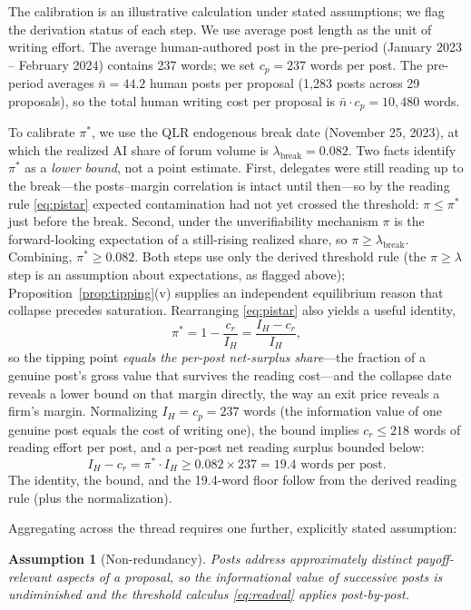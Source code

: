 \documentclass[12pt]{article}
\newtheorem{assumption}{Assumption}
\begin{document}
The calibration is an illustrative calculation under stated assumptions; we flag the derivation status of each step. We use average post length as the unit of writing effort. The average human-authored post in the pre-period (January 2023 -- February 2024) contains 237 words; we set $c_p = 237$ words per post. The pre-period averages $\bar{n} = 44.2$ human posts per proposal (1{,}283 posts across 29 proposals), so the total human writing cost per proposal is $\bar{n} \cdot c_p = 10{,}480$ words.

To calibrate $\pi^*$, we use the QLR endogenous break date (November 25, 2023), at which the realized AI share of forum volume is $\lambda_{\text{break}} = 0.082$. Two facts identify $\pi^*$ as a \emph{lower bound}, not a point estimate. First, delegates were still reading up to the break---the posts--margin correlation is intact until then---so by the reading rule \eqref{eq:pistar} expected contamination had not yet crossed the threshold: $\pi \le \pi^*$ just before the break. Second, under the unverifiability mechanism $\pi$ is the forward-looking expectation of a still-rising realized share, so $\pi \ge \lambda_{\text{break}}$. Combining, $\pi^* \ge 0.082$. Both steps use only the derived threshold rule (the $\pi \ge \lambda$ step is an assumption about expectations, as flagged above); Proposition~\ref{prop:tipping}(v) supplies an independent equilibrium reason that collapse precedes saturation. Rearranging \eqref{eq:pistar} also yields a useful identity,
\[
  \pi^* = 1 - \frac{c_r}{I_H} = \frac{I_H - c_r}{I_H},
\]
so the tipping point \emph{equals the per-post net-surplus share}---the fraction of a genuine post's gross value that survives the reading cost---and the collapse date reveals a lower bound on that margin directly, the way an exit price reveals a firm's margin. Normalizing $I_H = c_p = 237$ words (the information value of one genuine post equals the cost of writing one), the bound implies $c_r \le 218$ words of reading effort per post, and a per-post net reading surplus bounded below:
\[
  I_H - c_r = \pi^* \cdot I_H \ge 0.082 \times 237 = 19.4 \text{ words per post}.
\]
The identity, the bound, and the 19.4-word floor follow from the derived reading rule (plus the normalization).

Aggregating across the thread requires one further, explicitly stated assumption:

\begin{assumption}[Non-redundancy]
\label{ass:nr}
Posts address approximately distinct payoff-relevant aspects of a proposal, so the informational value of successive posts is undiminished and the threshold calculus \eqref{eq:readval} applies post-by-post.
\end{assumption}
\end{document}
